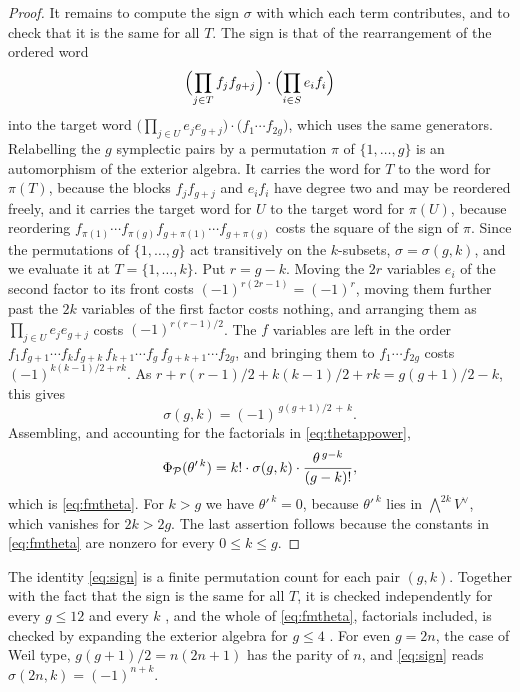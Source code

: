 \begin{proof}
It remains to compute the sign $\sigma$ with which each term contributes, and
to check that it is the same for all $T$. The sign is that of the
rearrangement of the ordered word
\[
  \Bigl(\prod_{j\in T}f_{j}f_{g+j}\Bigr)\cdot\Bigl(\prod_{i\in S}e_{i}f_{i}\Bigr)
\]
into the target word
$\bigl(\prod_{j\in U}e_{j}e_{g+j}\bigr)\cdot\bigl(f_{1}\cdots f_{2g}\bigr)$,
which uses the same generators. Relabelling the $g$ symplectic pairs by a
permutation $\pi$ of $\{1,\dots,g\}$ is an automorphism of the exterior
algebra. It
carries the word for $T$ to the word for $\pi(T)$, because the blocks
$f_{j}f_{g+j}$ and $e_{i}f_{i}$ have degree two and may be reordered freely,
and it carries the target word for $U$ to the target word for $\pi(U)$,
because reordering
$f_{\pi(1)}\cdots f_{\pi(g)}f_{g+\pi(1)}\cdots f_{g+\pi(g)}$ costs the
square of the sign of $\pi$. Since the permutations of $\{1,\dots,g\}$ act
transitively on the $k$-subsets, $\sigma=\sigma(g,k)$, and we evaluate it at
$T=\{1,\dots,k\}$. Put $r=g-k$. Moving the $2r$ variables $e_{i}$ of the
second factor to its front costs $(-1)^{r(2r-1)}=(-1)^{r}$, moving them
further past the $2k$ variables of the first factor costs nothing, and
arranging them as $\prod_{j\in U}e_{j}e_{g+j}$ costs $(-1)^{r(r-1)/2}$. The
$f$ variables are left in the order
$f_{1}f_{g+1}\cdots f_{k}f_{g+k}\,f_{k+1}\cdots f_{g}\,f_{g+k+1}\cdots f_{2g}$,
and bringing them to $f_{1}\cdots f_{2g}$ costs $(-1)^{k(k-1)/2+rk}$. As
$r+r(r-1)/2+k(k-1)/2+rk=g(g+1)/2-k$, this gives
\begin{equation}\label{eq:sign}
  \sigma(g,k)=(-1)^{\,g(g+1)/2\,+\,k}.
\end{equation}
Assembling, and accounting for the factorials in \eqref{eq:thetappower},
\[
  \Phi_{\mathcal{P}}(\theta'^{\,k})
  =k!\cdot\sigma(g,k)\cdot\frac{\theta^{\,g-k}}{(g-k)!},
\]
which is \eqref{eq:fmtheta}. For $k>g$ we have $\theta'^{\,k}=0$, because
$\theta'^{\,k}$ lies in $\bigwedge^{2k}V^{\vee}$, which vanishes for
$2k>2g$. The last assertion follows because the constants in
\eqref{eq:fmtheta} are nonzero for every $0\le k\le g$.
\end{proof}

\begin{remark}\label{rem:signcheck}
The identity \eqref{eq:sign} is a finite permutation count for each pair
$(g,k)$. Together with the fact that the sign is the same for all $T$, it is
checked independently for every $g\le12$ and every $k$ \cite{BMB26}, and the whole of \eqref{eq:fmtheta},
factorials included, is checked by expanding the exterior algebra for
$g\le4$ \cite{BMB26}. For even $g=2n$, the case of Weil type,
$g(g+1)/2=n(2n+1)$ has the parity of $n$, and \eqref{eq:sign} reads
$\sigma(2n,k)=(-1)^{n+k}$.
\end{remark}

